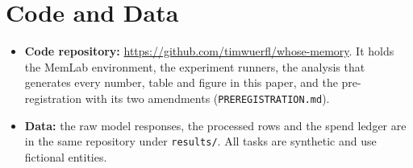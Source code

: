 \documentclass[11pt,letterpaper]{article}
\begin{document}


\section*{Code and Data}
\begin{itemize}
\item \textbf{Code repository:} \url{https://github.com/timwuerfl/whose-memory}. It holds the MemLab
environment, the experiment runners, the analysis that generates every number, table and figure in this
paper, and the pre-registration with its two amendments (\texttt{PREREGISTRATION.md}).
\item \textbf{Data:} the raw model responses, the processed rows and the spend ledger are in the same
repository under \texttt{results/}. All tasks are synthetic and use fictional entities.
\end{itemize}




\clearpage
\appendix
{}

\end{document}
